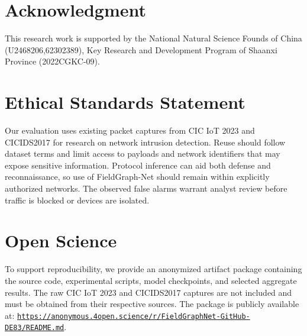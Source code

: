 \documentclass{article}
\begin{document}
\clearpage
\section{Acknowledgment}
This research work is supported by the National Natural Science Founds of China (U2468206,62302389), Key Research and Development Program of Shaanxi Province (2022CGKC-09).

\section{Ethical Standards Statement}
Our evaluation uses existing packet captures from CIC IoT 2023 and CICIDS2017
for research on network intrusion detection. Reuse should follow dataset terms
and limit access to payloads and network identifiers that may expose sensitive
information. Protocol inference can aid both defense and reconnaissance, so use of
FieldGraph-Net should remain within explicitly authorized networks. The observed
false alarms warrant analyst review before traffic is blocked or devices are
 isolated.

\section{Open Science}
To support reproducibility, we provide an anonymized artifact package containing the source code, experimental scripts, model checkpoints, and selected aggregate results. The raw CIC IoT 2023 and CICIDS2017 captures are not included and must be obtained from their respective sources. The package is publicly available at: \href{https://anonymous.4open.science/r/FieldGraphNet-GitHub-DE83/README.md}{\texttt{https://anonymous.4open.science/r/}\allowbreak\texttt{FieldGraphNet-GitHub-DE83/}\allowbreak\texttt{README.md}}.




\end{document}
